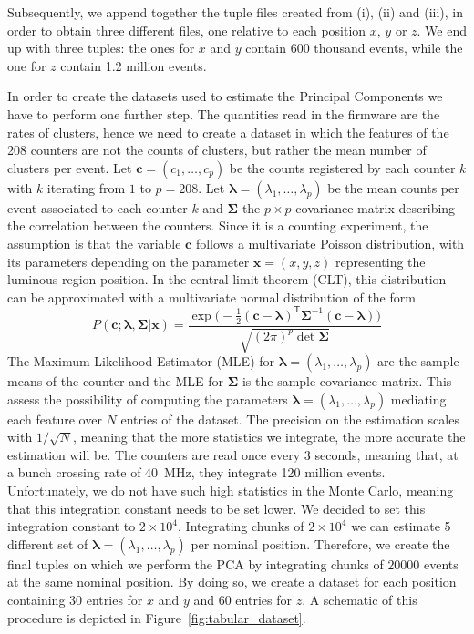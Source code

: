 Subsequently, we append together the tuple files created from (i), (ii) and (iii), in order to obtain three different files, one relative to each position $x$, $y$ or $z$. We end up with three tuples: the ones for $x$ and $y$ contain 600 thousand events, while the one for $z$ contain 1.2 million events. 

In order to create the datasets used to estimate the Principal Components we have to perform one further step.
The quantities read in the firmware are the rates of clusters, hence we need to create a dataset in which the features of the 208 counters are not the counts of clusters, but rather the mean number of clusters per event. 
Let $\mathbf{c}=(c_1, \dots, c_p)$ be the counts registered by each counter $k$ with $k$ iterating from $1$ to $p=208$. Let $\mathbf{\lambda}=(\lambda_1, \dots, \lambda_p)$ be the mean counts per event associated to each counter $k$ and $\mathbf{\Sigma}$ the $p\times p$ covariance matrix describing the correlation between the counters. Since it is a counting experiment, the assumption is that the variable $\mathbf{c}$ follows a multivariate Poisson distribution, with its parameters depending on the parameter $\mathbf{x}=(x,y,z)$ representing the luminous region position. In the central limit theorem (CLT), this distribution can be approximated with a multivariate normal distribution of the form 
\begin{equation}
    P(\mathbf{c} ; \mathbf{\lambda},\mathbf{\Sigma} |\mathbf{x}) = \frac{\exp \bigl(-\frac{1}{2}(\mathbf{c}-\mathbf{\lambda})^{\mathsf{T}}\mathbf{\Sigma}^{-1}(\mathbf{c}-\mathbf{\lambda})\bigr)}{\sqrt{(2\pi)^p\det\mathbf{\Sigma}}}\label{mvgaussian}
\end{equation} 
The Maximum Likelihood Estimator (MLE) for  $\mathbf{\lambda}=(\lambda_1, \dots, \lambda_p)$ are the sample means of the counter and the MLE for $\mathbf{\Sigma}$ is the sample covariance matrix.
This assess the possibility of computing the parameters  $\mathbf{\lambda}=(\lambda_1, \dots, \lambda_p)$ mediating each feature over $N$ entries of the dataset. The precision on the estimation scales with $1/\sqrt{N}$, meaning that the more statistics we integrate, the more accurate the estimation will be. 
The counters are read once every $3$ seconds, meaning that, at a bunch crossing rate of \SI{40}{\mega\hertz}, they integrate 120 million events. Unfortunately, we do not have such high statistics in the Monte Carlo, meaning that this integration constant needs to be set lower. We decided to set this integration constant to $2\times10^4$. Integrating chunks of $2\times10^4$ we can estimate 5 different set of $\mathbf{\lambda}=(\lambda_1, \dots, \lambda_p)$ per nominal position. Therefore, we create the final tuples on which we perform the PCA by integrating chunks of $20000$ events at the same nominal position. By doing so, we create a dataset for each position containing 30 entries for $x$ and $y$ and 60 entries for $z$. A schematic of this procedure is depicted in Figure~\ref{fig:tabular_dataset}. 


